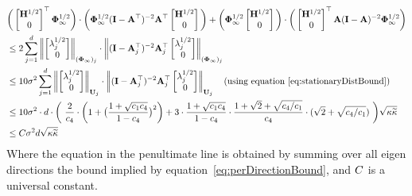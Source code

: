 \begin{align}
\label{eq:lotpmain2}
&\bigg(\begin{bmatrix}\H^{1/2}\\0\end{bmatrix}\T\phivih\bigg)\cdot\bigg(\phivih(\eye-\A\T)^{-2}\A\T\begin{bmatrix}\H^{1/2}\\0\end{bmatrix}\bigg)+\bigg(\phivih\begin{bmatrix}\H^{1/2}\\0\end{bmatrix}\bigg)\cdot\bigg(\begin{bmatrix}\H^{1/2}\\0\end{bmatrix}\T\A(\eye-\A)^{-2}\phivih\bigg)\nonumber\\
&\leq2\sum_{j=1}^{d} \adanorm{\begin{bmatrix}\lambda_j^{1/2}\\0\end{bmatrix}}_{(\phivi)_j}\cdot\adanorm{(\eye-\A_j\T)^{-2}\A_j\T\begin{bmatrix}\lambda_j^{1/2}\\0\end{bmatrix}}_{(\phivi)_j} \nonumber\\
&\leq10\sigma^2 \sum_{j=1}^{d} \adanorm{\begin{bmatrix}\lambda_j^{1/2}\\0\end{bmatrix}}_{\U_j}\cdot\adanorm{(\eye-\A_j\T)^{-2}\A_j\T\begin{bmatrix}\lambda_j^{1/2}\\0\end{bmatrix}}_{\U_j}\quad(\text{using equation~\ref{eq:stationaryDistBound}})\nonumber\\
&\leq10\sigma^2 \cdot d \cdot\bigg(\ \frac{2}{\cfour}\cdot\bigg(1+\big(\frac{1+\sqrt{\cone\cfour}}{1-\cfour}\big)^2\bigg) + 3 \cdot \frac{1+\sqrt{\cone\cfour}}{1-\cfour} \cdot \frac{1+\sqrt{2}+\sqrt{\cfour/\cone}}{\cfour} \cdot (\sqrt{2}+\sqrt{\cfour/\cone}) \ \bigg)\sqrt{\cnH\cnS}\nonumber\\
&\leq \UC \sigma^2 d \sqrt{\cnH\cnS}
\end{align}
Where the equation in the penultimate line is obtained by summing over all eigen directions the bound implied by equation~\ref{eq:perDirectionBound}, and $C$ is a universal constant.
